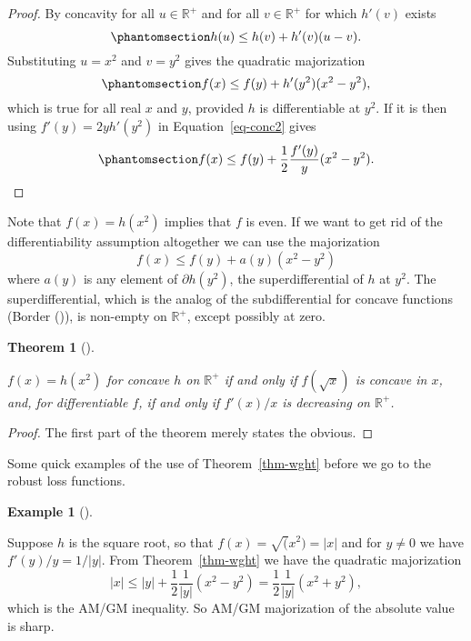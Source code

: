 \documentclass[
  12pt,
  letterpaper,
  DIV=11,
  numbers=noendperiod]{scrartcl}
\theoremstyle{definition}
\theoremstyle{plain}
\theoremstyle{plain}
\newtheorem{theorem}{Theorem}[section]
\theoremstyle{plain}
\theoremstyle{definition}
\newtheorem{example}{Example}[section]
\theoremstyle{remark}
\begin{document}
\begin{proof}
By concavity for all \(u\in\mathbb{R}^+\) and for all
\(v\in\mathbb{R}^+\) for which \(h'(v)\) exists
\begin{equation}\phantomsection\label{eq-concave}{
h(u)\leq h(v)+h'(v)(u-v).
}\end{equation} Substituting \(u=x^2\) and \(v=y^2\) gives the quadratic
majorization \begin{equation}\phantomsection\label{eq-conc2}{
f(x)\leq f(y)+h'(y^2)(x^2-y^2),
}\end{equation} which is true for all real \(x\) and \(y\), provided
\(h\) is differentiable at \(y^2\). If it is then using
\(f'(y)=2yh'(y^2)\) in Equation~\ref{eq-conc2} gives
\begin{equation}\phantomsection\label{eq-concmaj}{
f(x)\leq f(y)+\frac12\frac{f'(y)}{y}(x^2-y^2).
}\end{equation}
\end{proof}

Note that \(f(x)=h(x^2)\) implies that \(f\) is even. If we want to get
rid of the differentiability assumption altogether we can use the
majorization \[
f(x)\leq f(y)+a(y)(x^2-y^2)
\] where \(a(y)\) is any element of \(\partial h(y^2)\), the
superdifferential of \(h\) at \(y^2\). The superdifferential, which is
the analog of the subdifferential for concave functions (Border
()), is non-empty on \(\mathbb{R}^+\),
except possibly at zero.

\begin{theorem}[]\protect\hypertarget{thm-sqrt}{}\label{thm-sqrt}

\(f(x)=h(x^2)\) for concave \(h\) on \(\mathbb{R}^+\) if and only if
\(f(\sqrt{x})\) is concave in \(x\), and, for differentiable \(f\), if
and only if \(f'(x)/x\) is decreasing on \(\mathbb{R}^+\).

\end{theorem}

\begin{proof}
The first part of the theorem merely states the obvious.
\end{proof}

Some quick examples of the use of Theorem~\ref{thm-wght} before we go to
the robust loss functions.

\begin{example}[]\protect\hypertarget{exm-sqrt}{}\label{exm-sqrt}

Suppose \(h\) is the square root, so that \(f(x)=\sqrt(x^2)=|x|\) and
for \(y\not=0\) we have \(f'(y)/y=1/|y|\). From Theorem~\ref{thm-wght}
we have the quadratic majorization \[
|x|\leq|y|+\frac12\frac{1}{|y|}(x^2-y^2)=\frac12\frac{1}{|y|}(x^2+y^2),
\] which is the AM/GM inequality. So AM/GM majorization of the absolute
value is sharp.

\end{example}
\end{document}
